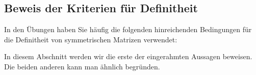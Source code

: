 

























\clearpage
\subsection{Beweis der Kriterien für Definitheit}
\label{sec:beweisKriterien}

In den Übungen haben Sie häufig die folgenden hinreichenden Bedingungen für die Definitheit von symmetrischen Matrizen verwendet:

\noindent{}

In diesem Abschnitt werden wir die erste der eingerahmten Aussagen beweisen. Die beiden anderen kann man ähnlich begründen.


